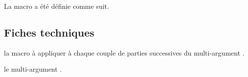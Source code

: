 \documentclass[12pt,a4paper]{article}
\begin{document}
La macro  a été définie comme suit.

\begin{latexex-alone}
\newcommand\decocoupleafterfirst[2]{%
    \ifnum\value{tns@multi@apply@couple@position}=1
        \{#1-#2\}%
    \else%
        (#1)[#2]%
    \fi
}

\newcommand\multiapplycoupleafterone[1]{%
    \tns@multi@apply@couple{\decocoupleafterfirst}{#1}
}
\end{latexex-alone}




\subsection{Fiches techniques}


 la macro à appliquer à chaque couple de parties successives du \og multi-argument \fg.

 le \og multi-argument \fg.
\end{document}
